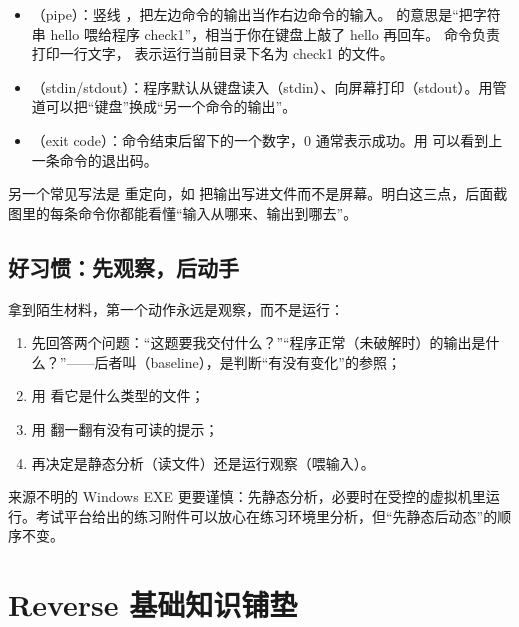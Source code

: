 \documentclass[UTF8,12pt,oneside]{ctexbook}
\begin{document}
\begin{itemize}
\item {}（pipe）：竖线 \code{|}，把左边命令的输出当作右边命令的输入。 的意思是“把字符串 hello 喂给程序 check1”，相当于你在键盘上敲了 hello 再回车。 命令负责打印一行文字， 表示运行当前目录下名为 check1 的文件。
\item {}（stdin/stdout）：程序默认从键盘读入（stdin）、向屏幕打印（stdout）。用管道可以把“键盘”换成“另一个命令的输出”。
\item {}（exit code）：命令结束后留下的一个数字，0 通常表示成功。用  可以看到上一条命令的退出码。
\end{itemize}

另一个常见写法是 \code{>} 重定向，如  把输出写进文件而不是屏幕。明白这三点，后面截图里的每条命令你都能看懂“输入从哪来、输出到哪去”。


\section{好习惯：先观察，后动手}
拿到陌生材料，第一个动作永远是观察，而不是运行：
\begin{enumerate}
\item 先回答两个问题：“这题要我交付什么？”“程序正常（未破解时）的输出是什么？”——后者叫（baseline），是判断“有没有变化”的参照；
\item 用  看它是什么类型的文件；
\item 用  翻一翻有没有可读的提示；
\item 再决定是静态分析（读文件）还是运行观察（喂输入）。
\end{enumerate}
来源不明的 Windows EXE 更要谨慎：先静态分析，必要时在受控的虚拟机里运行。考试平台给出的练习附件可以放心在练习环境里分析，但“先静态后动态”的顺序不变。


\chapter{Reverse 基础知识铺垫}
\end{document}
